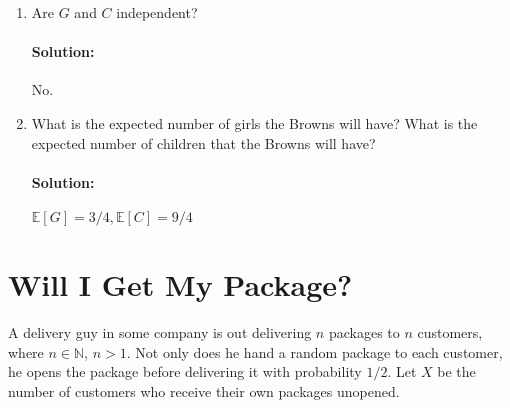 \documentclass[11pt, notitlepage]{article}
\newcommand{\N}{\mathbb{N}}
\newcommand{\E}{\mathbb{E}}
\newcommand{\Question}[1]{\newpage\section{#1}}
\newenvironment{solution}{\paragraph{Solution:}}{\hfill \vspace{10mm}}
\begin{document}
\begin{enumerate}[label=\alph*.)]
\begin{solution}

	
These values match the sample space, therefore they are as expected.
\end{solution}
\item Are $G$ and $C$ independent?
\begin{solution}
	No.
\end{solution}
\item What is the expected number of girls the Browns will have? What is the expected number of children that the Browns will have?
	\begin{solution}
	$\E[G]=3/4, \E[C]=9/4$
	\end{solution}

\end{enumerate}


\Question{Will I Get My Package?}

A delivery guy in some company is out delivering $n$ packages to $n$ customers, where $n \in \N$, $n > 1$.
Not only does he hand a random package to each customer, he opens the package before delivering it with probability $1/2$.
Let $X$ be the number of customers who receive their own packages unopened. 
\end{document}
